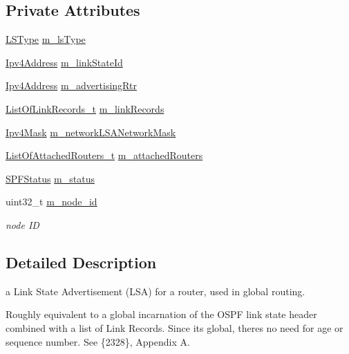 \subsection*{Private Attributes}
\begin{DoxyCompactItemize}
\item 
\hyperlink{classns3_1_1GlobalRoutingLSA_a34eb53a1ed37c877923b74d671224fde}{L\+S\+Type} \hyperlink{classns3_1_1GlobalRoutingLSA_a9fdb1b0a15b7b25dfb462a6cc0a04d8b}{m\+\_\+ls\+Type}
\item 
\hyperlink{classns3_1_1Ipv4Address}{Ipv4\+Address} \hyperlink{classns3_1_1GlobalRoutingLSA_a39580ef7a79397ef08b0480e1a606e7a}{m\+\_\+link\+State\+Id}
\item 
\hyperlink{classns3_1_1Ipv4Address}{Ipv4\+Address} \hyperlink{classns3_1_1GlobalRoutingLSA_a8eeb49a0e1c50afed4c016caa8f1c582}{m\+\_\+advertising\+Rtr}
\item 
\hyperlink{classns3_1_1GlobalRoutingLSA_a8bbba2d0ab5355f5f3e211c3137e9183}{List\+Of\+Link\+Records\+\_\+t} \hyperlink{classns3_1_1GlobalRoutingLSA_a67b7b857643304afcd395debe0498363}{m\+\_\+link\+Records}
\item 
\hyperlink{classns3_1_1Ipv4Mask}{Ipv4\+Mask} \hyperlink{classns3_1_1GlobalRoutingLSA_ad5a4590c0997ed0e67f4d46ad0b2decf}{m\+\_\+network\+L\+S\+A\+Network\+Mask}
\item 
\hyperlink{classns3_1_1GlobalRoutingLSA_a1eb32d6aae2322830368720d24a39a65}{List\+Of\+Attached\+Routers\+\_\+t} \hyperlink{classns3_1_1GlobalRoutingLSA_aa7b5e6e43ade3f813a12c47e4420b3eb}{m\+\_\+attached\+Routers}
\item 
\hyperlink{classns3_1_1GlobalRoutingLSA_a18bf63da580856fe1cc158aa855af1bd}{S\+P\+F\+Status} \hyperlink{classns3_1_1GlobalRoutingLSA_a9b3e65ddc724b95ddd7f4aae75d7518b}{m\+\_\+status}
\item 
uint32\+\_\+t \hyperlink{classns3_1_1GlobalRoutingLSA_a0c9199f2382920867bc1120b1d2554a2}{m\+\_\+node\+\_\+id}
\begin{DoxyCompactList}\small\item\em node ID \end{DoxyCompactList}\end{DoxyCompactItemize}


\subsection{Detailed Description}
a Link State Advertisement (L\+SA) for a router, used in global routing. 

Roughly equivalent to a global incarnation of the O\+S\+PF link state header combined with a list of Link Records. Since it\textquotesingle{}s global, there\textquotesingle{}s no need for age or sequence number. See \{2328\}, Appendix A. 

